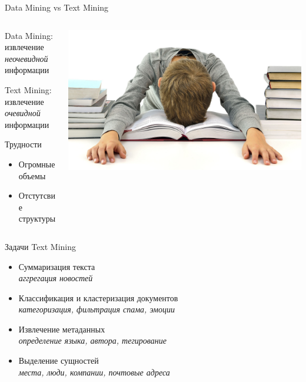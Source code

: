\documentclass[10pt,a4paper]{beamer}
\begin{document}
\begin{frame}{Data Mining vs Text Mining}

	\begin{columns}[T]
    \begin{column}{.5\textwidth}
   	Data Mining: \\ извлечение {\it неочевидной} информации

	\vspace{1em}
	Text Mining: \\ извлечение {\it очевидной} информации

\vspace{1em}
Трудности
\begin{itemize}
\item Огромные объемы
\item Отстутсвие структуры
\end{itemize}
	    
    \end{column}
    \begin{column}{.5\textwidth}
    \vspace{1em}
    \includegraphics[scale=0.06]{images/books.jpg}    
    \end{column}
  \end{columns}

\end{frame}


\begin{frame}{Задачи Text Mining}

\begin{itemize}
\item Суммаризация текста \\
{\it аггрегация новостей}
\item Классификация и кластеризация документов \\
{\it категоризация, фильтрация спама, эмоции}
\item Извлечение метаданных \\
{\it определение языка, автора, тегирование}
\item Выделение сущностей \\
{\it места, люди, компании, почтовые адреса}
\end{itemize}

\end{frame}
\end{document}
